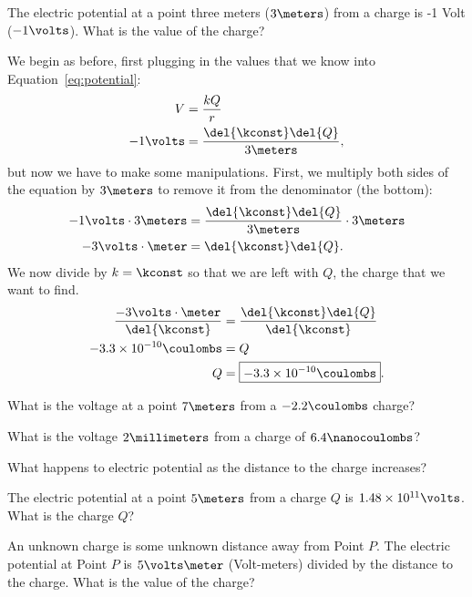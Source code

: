 \documentclass[12pt,paper=letter]{scrartcl}
\begin{document}
    \begin{exboxed}
        The electric potential at a point three meters ($3\meters$) from a charge is -1 Volt ($-1\volts$).
        What is the value of the charge?
    \end{exboxed}

    We begin as before, first plugging in the values that we know into Equation~\ref{eq:potential}:
    \begin{align*}
        V&=\frac{kQ}{r}\\
        -1\volts&=\frac{\del{\kconst}\del{Q}}{3 \meters},
    \end{align*}
    but now we have to make some manipulations.
    First, we multiply both sides of the equation by $3\meters$ to remove it from the denominator (the bottom):
    \begin{align*}
        -1\volts\cdot 3\meters&=\frac{\del{\kconst}\del{Q}}{3 \meters}\cdot 3 \meters\\
        -3 \volts\cdot\meter&=\del{\kconst}\del{Q}.
    \end{align*}
    We now divide by $k=\kconst$ so that we are left with $Q$,
    the charge that we want to find.
    \begin{align*}
        \frac{-3 \volts\cdot\meter}{\del{\kconst}}&=\frac{\del{\kconst}\del{Q}}{\del{\kconst}}\\
        -3.3\times 10^{-10} \coulombs &= Q\\
        Q &= \boxed{-3.3\times 10^{-10} \coulombs}.
    \end{align*}
    \begin{mdframed}[style=exmdbox]
        \begin{problem}
            What is the voltage at a point $7\meters$ from a $-2.2\coulombs$ charge?
        \end{problem}
        \begin{problem}
            What is the voltage $2\millimeters$ from a charge of $6.4\nanocoulombs$? \hint{\ref{hint:table_of_conversions}}
        \end{problem}

        \begin{problem}
            What happens to electric potential as the distance to the charge increases? \hint{\ref{hint:approximate_limit}}
        \end{problem}

        \begin{problem}[Shieh]
            The electric potential at a point $5\meters$ from a charge $Q$ is $1.48\times10^{11} \volts$.
            What is the charge $Q$?
        \end{problem}

        \begin{problem}[Challenge]
            An unknown charge is some unknown distance away from Point $P$.
            The electric potential at Point $P$ is $5 \volts\meter$ (Volt-meters) divided by the distance to the charge.
            What is the value of the charge? \hint{\ref{hint:voltage_challenge_1}}
        \end{problem}

    \end{mdframed}
\end{document}
